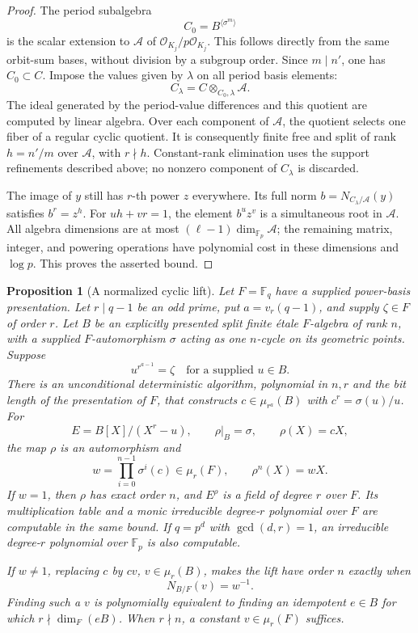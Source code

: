 \documentclass[11pt]{article}
\newtheorem{proposition}[theorem]{Proposition}
\theoremstyle{definition}
\theoremstyle{remark}
\begin{document}
\begin{proof}
The period subalgebra
\[
                  C_0=B^{\langle\sigma^{m}\rangle}
\]
is the scalar extension to \(\mathcal A\) of
\(\mathcal O_{K_j}/p\mathcal O_{K_j}\).
This follows directly from the same orbit-sum bases, without division
by a subgroup order.  Since \(m\mid n'\), one has \(C_0\subset C\).
Impose the values given by \(\lambda\) on all period basis elements:
\[
                       C_\lambda=C\otimes_{C_0,\lambda}\mathcal A.
\]
The ideal generated by the period-value differences and this quotient
are computed by linear algebra.  Over each component of \(\mathcal A\),
the quotient selects one fiber of a regular cyclic quotient.
It is consequently finite free and split of rank
\(h=n'/m\) over \(\mathcal A\), with \(r\nmid h\).
Constant-rank elimination uses the support refinements described above;
no nonzero component of \(C_\lambda\) is discarded.

The image of \(y\) still has \(r\)-th power \(z\) everywhere.
Its full norm \(b=N_{C_\lambda/\mathcal A}(y)\) satisfies \(b^r=z^h\).
For \(uh+vr=1\), the element \(b^u z^v\) is a simultaneous root in
\(\mathcal A\).  All algebra dimensions are at most
\((\ell-1)\dim_{\mathbb F_p}\mathcal A\); the remaining matrix,
integer, and powering operations have polynomial cost in these
dimensions and \(\log p\).  This proves the asserted bound.
\end{proof}

\begin{proposition}[A normalized cyclic lift]
\label{prop:normalized-cyclic-lift}
Let \(F=\mathbb F_q\) have a supplied power-basis presentation.
Let \(r\mid q-1\) be an odd prime, put \(a=v_r(q-1)\), and supply
\(\zeta\in F\) of order \(r\).
Let \(B\) be an explicitly presented split finite \'{e}tale
\(F\)-algebra of rank \(n\), with a supplied \(F\)-automorphism
\(\sigma\) acting as one \(n\)-cycle on its geometric points.
Suppose
\[
                          u^{r^{a-1}}=\zeta
                  \quad\text{for a supplied }u\in B.
\]
There is an unconditional deterministic algorithm, polynomial in
\(n,r\) and the bit length of the presentation of \(F\), that constructs
\(c\in\mu_{r^a}(B)\) with \(c^r=\sigma(u)/u\).
For
\[
 E=B[X]/(X^r-u),\qquad
 \rho|_B=\sigma,\qquad \rho(X)=cX,
\]
the map \(\rho\) is an automorphism and
\[
 w=\prod_{i=0}^{n-1}\sigma^i(c)\in\mu_r(F),\qquad
                         \rho^n(X)=wX.
\]
If \(w=1\), then \(\rho\) has exact order \(n\), and \(E^\rho\)
is a field of degree \(r\) over \(F\).
Its multiplication table and a monic irreducible degree-\(r\)
polynomial over \(F\) are computable in the same bound.
If \(q=p^d\) with \(\gcd(d,r)=1\), an irreducible degree-\(r\)
polynomial over \(\mathbb F_p\) is also computable.

If \(w\ne1\), replacing \(c\) by \(cv\), \(v\in\mu_r(B)\), makes
the lift have order \(n\) exactly when
\[
                            N_{B/F}(v)=w^{-1}.
\]
Finding such a \(v\) is polynomially equivalent to finding an
idempotent \(e\in B\) for which \(r\nmid\dim_F(eB)\).
When \(r\nmid n\), a constant \(v\in\mu_r(F)\) suffices.
\end{proposition}
\end{document}
